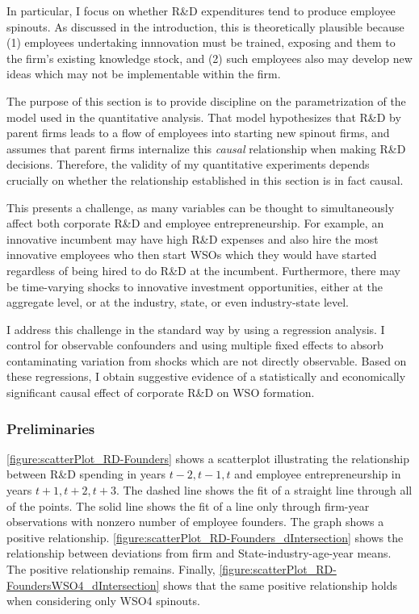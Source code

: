 \documentclass[11pt,english]{article}
\begin{document}
In particular, I focus on whether R\&D expenditures tend to produce employee spinouts. As discussed in the introduction, this is theoretically plausible because (1) employees undertaking innnovation must be trained, exposing and them to the firm's existing knowledge stock, and (2) such employees also may develop new ideas which may not be implementable within the firm.  

The purpose of this section is to provide discipline on the parametrization of the model used in the quantitative analysis. That model hypothesizes that R\&D by parent firms leads to a flow of employees into starting new spinout firms, and assumes that parent firms internalize this \textit{causal} relationship when making R\&D decisions. Therefore, the validity of my quantitative experiments depends crucially on whether the relationship established in this section is in fact causal. 

This presents a challenge, as many variables can be thought to simultaneously affect both corporate R\&D and employee entrepreneurship. For example, an innovative incumbent may have high R\&D expenses and also hire the most innovative employees who then start WSOs which they would have started regardless of being hired to do R\&D at the incumbent. Furthermore, there may be time-varying shocks to innovative investment opportunities, either at the aggregate level, or at the industry, state, or even industry-state level. 

I address this challenge in the standard way by using a regression analysis. I control for observable confounders and using multiple fixed effects to absorb contaminating variation from shocks which are not directly observable. Based on these regressions, I obtain suggestive evidence of a statistically and economically significant causal effect of corporate R\&D on WSO formation.

\subsubsection{Preliminaries}

\autoref{figure:scatterPlot_RD-Founders} shows a scatterplot illustrating the relationship between R\&D spending in years $t-2,t-1,t$ and employee entrepreneurship in years $t+1,t+2,t+3$. The dashed line shows the fit of a straight line through all of the points. The solid line shows the fit of a line only through firm-year observations with nonzero number of employee founders. The graph shows a positive relationship. \autoref{figure:scatterPlot_RD-Founders_dIntersection} shows the relationship between deviations from firm and State-industry-age-year means. The positive relationship remains. Finally, \autoref{figure:scatterPlot_RD-FoundersWSO4_dIntersection} shows that the same positive relationship holds when considering only WSO4 spinouts. 
\end{document}
